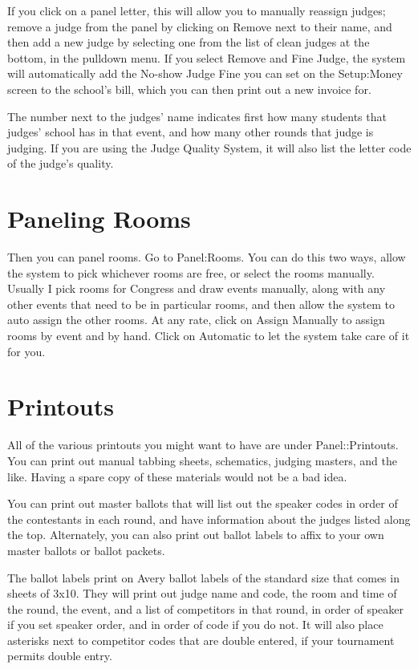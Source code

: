 \documentclass[12pt]{report} \usepackage {fullpage} \usepackage{times}
\begin{document}
If you click on a panel letter, this will allow you to manually reassign
judges; remove a judge from the panel by clicking on Remove next to their
name, and then add a new judge by selecting one from the list of clean
judges at the bottom, in the pulldown menu.    If you select Remove and
Fine Judge, the system will automatically add the No-show Judge Fine you
can set on the Setup:Money screen to the school's bill, which you can then
print out a new invoice for. 

The number next to the judges' name indicates first how many students that
judges' school has in that event, and how many other rounds that judge is
judging.   If you are using the Judge Quality System, it will also list the
letter code of the judge's quality.  
	
	
\section{Paneling Rooms}

Then you can panel rooms.  Go to Panel:Rooms.   You can do this two ways,
allow the system to pick whichever rooms are free, or select the rooms
manually.  Usually I pick rooms for Congress and draw events manually,
along with any other events that need to be in particular rooms, and then
allow the system to auto assign the other rooms.   At any rate, click on
Assign Manually to assign rooms by event and by hand.  Click on Automatic
to let the system take care of it for you. 
 	
\section{Printouts}

All of the various printouts you might want to have are under
Panel::Printouts.  You can print out manual tabbing sheets, schematics,
judging masters, and the like.  Having a spare copy of these materials
would not be a bad idea.    

You can print out master ballots that will list out the speaker codes in
order of the contestants in each round, and have information about the
judges listed along the top.   Alternately, you can also print out ballot
labels to affix to your own master ballots or ballot packets.

The ballot labels print on Avery ballot labels of the standard size that
comes in sheets of 3x10.  They will print out judge name and code, the room
and time of the round, the event, and a list of competitors in that round,
in order of speaker if you set speaker order, and in order of code if you
do not.   It will also place asterisks next to competitor codes that are
double entered, if your tournament permits double entry.
\end{document}
